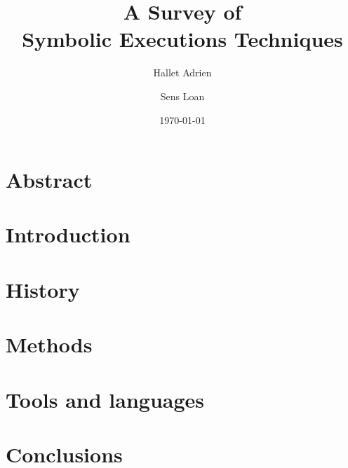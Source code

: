 \documentclass[11pt]{article}
\begin{document}
\title{A Survey of\\Symbolic Executions Techniques} %
\author{Hallet Adrien \and Sens Loan}
\date{\today}
\maketitle

  \section*{Abstract}

  \section{Introduction}

  \section{History}

  \section{Methods}

  \section{Tools and languages}

  \section{Conclusions}



{}

\end{document}
